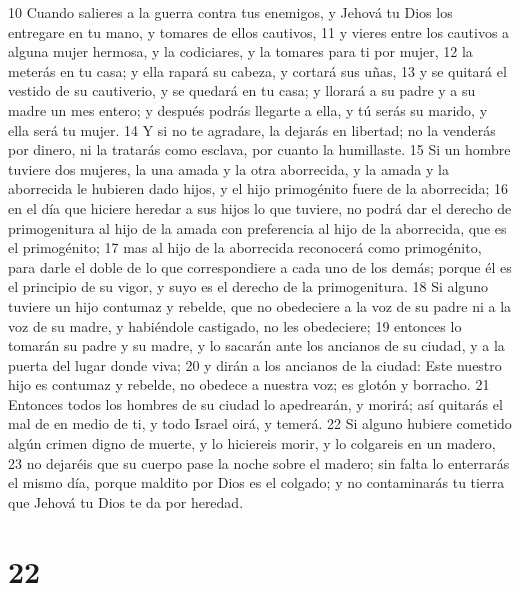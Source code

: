 10 Cuando salieres a la guerra contra tus enemigos, y Jehová tu Dios los entregare en tu mano, y tomares de ellos cautivos,
11 y vieres entre los cautivos a alguna mujer hermosa, y la codiciares, y la tomares para ti por mujer,
12 la meterás en tu casa; y ella rapará su cabeza, y cortará sus uñas,
13 y se quitará el vestido de su cautiverio, y se quedará en tu casa; y llorará a su padre y a su madre un mes entero; y después podrás llegarte a ella, y tú serás su marido, y ella será tu mujer.
14 Y si no te agradare, la dejarás en libertad; no la venderás por dinero, ni la tratarás como esclava, por cuanto la humillaste.
15 Si un hombre tuviere dos mujeres, la una amada y la otra aborrecida, y la amada y la aborrecida le hubieren dado hijos, y el hijo primogénito fuere de la aborrecida;
16 en el día que hiciere heredar a sus hijos lo que tuviere, no podrá dar el derecho de primogenitura al hijo de la amada con preferencia al hijo de la aborrecida, que es el primogénito;
17 mas al hijo de la aborrecida reconocerá como primogénito, para darle el doble de lo que correspondiere a cada uno de los demás; porque él es el principio de su vigor, y suyo es el derecho de la primogenitura.
18 Si alguno tuviere un hijo contumaz y rebelde, que no obedeciere a la voz de su padre ni a la voz de su madre, y habiéndole castigado, no les obedeciere;
19 entonces lo tomarán su padre y su madre, y lo sacarán ante los ancianos de su ciudad, y a la puerta del lugar donde viva;
20 y dirán a los ancianos de la ciudad: Este nuestro hijo es contumaz y rebelde, no obedece a nuestra voz; es glotón y borracho.
21 Entonces todos los hombres de su ciudad lo apedrearán, y morirá; así quitarás el mal de en medio de ti, y todo Israel oirá, y temerá.
22 Si alguno hubiere cometido algún crimen digno de muerte, y lo hiciereis morir, y lo colgareis en un madero,
23 no dejaréis que su cuerpo pase la noche sobre el madero; sin falta lo enterrarás el mismo día, porque maldito por Dios es el colgado; y no contaminarás tu tierra que Jehová tu Dios te da por heredad.

\chapter{22}

